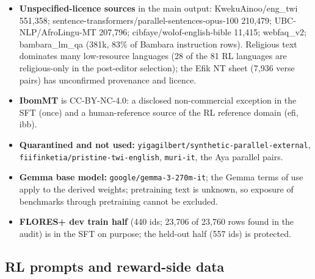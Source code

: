 \begin{itemize}
\item \textbf{Unspecified-licence sources} in the main output: KwekuAinoo/eng\_twi 551,358; sentence-transformers/parallel-sentences-opus-100 210,479; UBC-NLP/AfroLingu-MT 207,796; cibfaye/wolof-english-bible 11,415; webfaq\_v2; bambara\_lm\_qa (381k, 83\% of Bambara instruction rows). Religious text dominates many low-resource languages (28 of the 81 RL languages are religious-only in the post-editor selection); the Efik NT sheet (7,936 verse pairs) has unconfirmed provenance and licence.
\item \textbf{IbomMT} is CC-BY-NC-4.0: a disclosed non-commercial exception in the SFT (once) and a human-reference source of the RL reference domain (efi, ibb).
\item \textbf{Quarantined and not used:} \texttt{yigagilbert/\allowbreak{}synthetic-\allowbreak{}parallel-\allowbreak{}external}, \texttt{fiifinketia/\allowbreak{}pristine-\allowbreak{}twi-\allowbreak{}english}, \texttt{muri-\allowbreak{}it}, the Aya parallel pairs.
\item \textbf{Gemma base model:} \texttt{google/\allowbreak{}gemma-\allowbreak{}3-\allowbreak{}270m-\allowbreak{}it}; the Gemma terms of use apply to the derived weights; pretraining text is unknown, so exposure of benchmarks through pretraining cannot be excluded.
\item \textbf{FLORES+ dev train half} (440 ids; 23,706 of 23,760 rows found in the audit) is in the SFT on purpose; the held-out half (557 ids) is protected.
\end{itemize}

\subsection{RL prompts and reward-side data}


